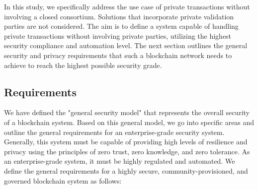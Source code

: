 In this study, we specifically address the use case of private transactions without involving a closed consortium. Solutions that incorporate private validation parties are not considered. The aim is to define a system capable of handling private transactions without involving private parties, utilizing the highest security compliance and automation level.
The next section outlines the general security and privacy requirements that such a blockchain network needs to achieve to reach the highest possible security grade. 

\subsection{Requirements}
We have defined the "general security model" that represents the overall security of a blockchain system. Based on this general model, we go into specific areas and outline the general requirements for an enterprise-grade security system. Generally, this system must be capable of providing high levels of resilience and privacy using the principles of zero trust, zero knowledge, and zero tolerance. As an enterprise-grade system, it must be highly regulated and automated. 
We define the general requirements for a highly secure, community-provisioned, and governed blockchain system as follows:

